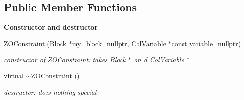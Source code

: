 \subsection*{Public Member Functions}
\begin{Indent}\textbf{ Constructor and destructor}\par
\begin{DoxyCompactItemize}
\item 
\mbox{\hyperlink{class_s_m_spp__di__unipi__it_1_1_z_o_constraint_a02dd3d960f5b45dcf4e11d058d0bcb72}{Z\+O\+Constraint}} (\mbox{\hyperlink{class_s_m_spp__di__unipi__it_1_1_block}{Block}} $\ast$my\+\_\+block=nullptr, \mbox{\hyperlink{class_s_m_spp__di__unipi__it_1_1_col_variable}{Col\+Variable}} $\ast$const variable=nullptr)
\begin{DoxyCompactList}\small\item\em constructor of \mbox{\hyperlink{class_s_m_spp__di__unipi__it_1_1_z_o_constraint}{Z\+O\+Constraint}}\+: takes \mbox{\hyperlink{class_s_m_spp__di__unipi__it_1_1_block}{Block}} $\ast$ an d \mbox{\hyperlink{class_s_m_spp__di__unipi__it_1_1_col_variable}{Col\+Variable}} $\ast$ \end{DoxyCompactList}\item 
\mbox{\label{class_s_m_spp__di__unipi__it_1_1_z_o_constraint_a17eddae6c30c7bd0a8e9a6219a2480db}} 
virtual \mbox{\hyperlink{class_s_m_spp__di__unipi__it_1_1_z_o_constraint_a17eddae6c30c7bd0a8e9a6219a2480db}{$\sim$\+Z\+O\+Constraint}} ()
\begin{DoxyCompactList}\small\item\em destructor\+: does nothing special \end{DoxyCompactList}\end{DoxyCompactItemize}
\end{Indent}
